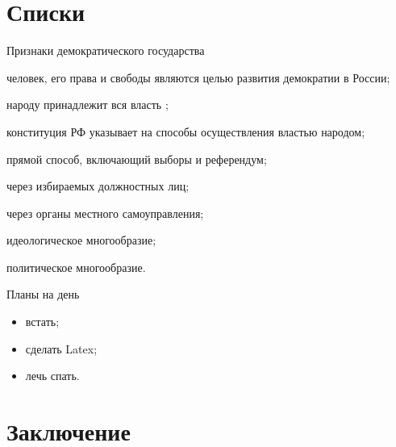 \documentclass[12pt,a4paper, oneside]{extreport}
\begin{document}


\tableofcontents









\chapter{Списки}
Признаки демократического государства
\begin{twoenumerate}
	\item человек, его права и свободы являются целью развития демократии в России;
	\item народу принадлежит вся власть ;
	\item конституция РФ указывает на способы осуществления властью народом;
	\begin{twoenumerate}
		\item прямой способ, включающий выборы и референдум; 
		\item через избираемых должностных лиц; 
		\item через органы местного самоуправления;
	\end{twoenumerate}
	\item идеологическое многообразие;
	\item политическое многообразие.
\end{twoenumerate}

Планы на день
\begin{itemize}
	\item встать;
	\item сделать Latex; 
	\item лечь спать.
\end{itemize}


\chapter*{Заключение}





\end{document}
